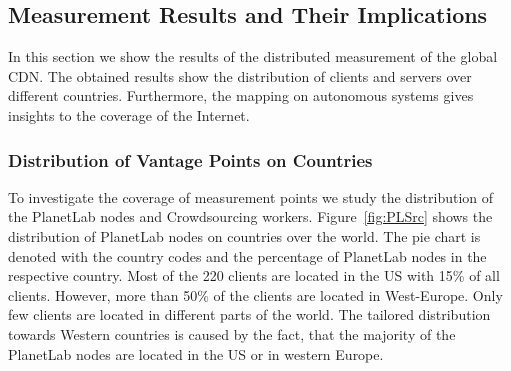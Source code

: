 \subsection{Measurement Results and Their Implications}
\label{sec:crowd:results}

In this section we show the results of the distributed measurement of the global CDN.
The obtained results show the distribution of clients and servers over different countries.
Furthermore, the mapping on autonomous systems gives insights to the coverage of the Internet.

\subsubsection{Distribution of Vantage Points on Countries}

To investigate the coverage of measurement points we study the distribution of the PlanetLab nodes and Crowdsourcing workers.
Figure~\ref{fig:PLSrc} shows the distribution of PlanetLab nodes on countries over the world.
The pie chart is denoted with the country codes and the percentage of PlanetLab nodes in the respective country.
Most of the 220 clients are located in the US with 15\% of all clients.
However, more than 50\% of the clients are located in West-Europe.
Only few clients are located in different parts of the world.
The tailored distribution towards Western countries is caused by the fact, that the majority of the PlanetLab nodes are located in the US or in western Europe.

